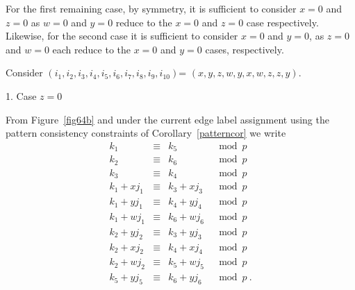 For the first remaining case, by symmetry, it is sufficient to
consider $x=0$ and $z=0$ as $w=0$ and $y=0$ reduce to the $x=0$
and $z=0$ case respectively. Likewise, for the second case it is
sufficient to consider $x=0$ and $y=0$, as $z=0$ and $w=0$ each
reduce to the $x=0$ and $y=0$ cases, respectively.






Consider $(i_1,i_2,i_3,i_4,i_5,i_6,i_7,i_8,i_9,i_{10})$=
$(x,y,z,w,y,x,w,z,z,y)$.

1. Case $z=0$

 From Figure~\ref{fig64b} and under the current edge label
 assignment using the pattern consistency constraints of Corollary~\ref{patterncor} we write
\begin{equation}\label{eq10a}\begin{array}{ccccc}
k_1 & \equiv &k_5 &\mod p\\
k_2 & \equiv &k_6 &\mod p\\
k_3 & \equiv &k_4 &\mod p\\
k_1+xj_1 & \equiv & k_3+xj_3 &\mod p\\
k_1+yj_1 & \equiv & k_4+yj_4 &\mod p\\
k_1+wj_1 & \equiv & k_6+wj_6 &\mod p\\
k_2+yj_2 & \equiv & k_3+yj_3 &\mod p\\
k_2+xj_2 & \equiv & k_4+xj_4 &\mod p\\
k_2+wj_2 & \equiv & k_5+wj_5 &\mod p\\
k_5+yj_5 & \equiv & k_6+yj_6 &\mod p~.
\end{array}\end{equation}

